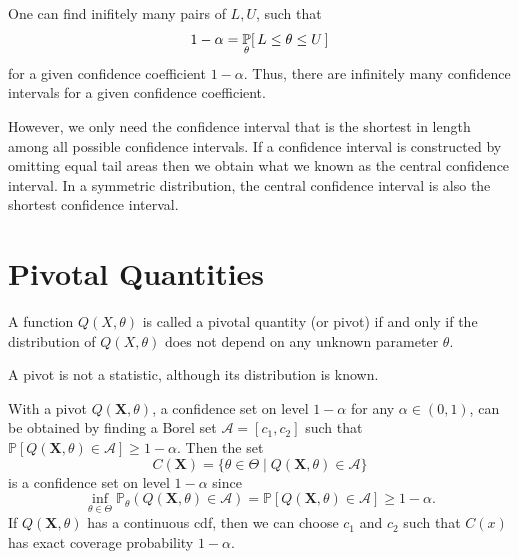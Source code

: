 One can find inifitely many pairs of $L, U$, such that 
\[
    1 - \alpha = \uprob[\theta]{ L \leq \theta \leq U }
\]
for a given confidence coefficient $1 - \alpha$. Thus, 
there are infinitely many confidence intervals for a given confidence coefficient.

However, we only need the confidence interval that is the shortest in length among all possible confidence intervals. 
If a confidence interval is constructed by omitting equal tail areas then we 
obtain what we known as the central confidence interval. 
In a symmetric distribution, the central confidence interval is also the shortest confidence interval.

\section{Pivotal Quantities}

\begin{definition}
    A function $Q(X, \theta)$ is called a pivotal quantity (or pivot) 
    if and only if the distribution of $Q(X, \theta)$ does not depend on any unknown parameter $\theta$.
\end{definition}
\begin{remark}
    A pivot is not a statistic, although its distribution is known. 
\end{remark}

With a pivot $Q(\mathbf{X}, \theta)$, a confidence set on level $1 - \alpha$ for any $\alpha \in (0,1)$, can be obtained 
by finding a Borel set $\mathcal{A} = [c_1, c_2]$ such that $\mathbb{P}[Q(\mathbf{X}, \theta) \in \mathcal{A}] \geq 1 - \alpha$.
Then the set 
\begin{equation}
    C(\mathbf{X}) = \{ \theta \in \Theta \mid Q(\mathbf{X}, \theta) \in \mathcal{A} \}
\end{equation}
is a confidence set on level $1 - \alpha$ since
\begin{equation}
    \inf_{\theta \in \Theta} \mathbb{P}_\theta(Q(\mathbf{X}, \theta) \in \mathcal{A}) = \mathbb{P}[Q(\mathbf{X}, \theta) \in \mathcal{A}] \geq 1 - \alpha.
\end{equation}
If $Q(\mathbf{X}, \theta)$ has a continuous cdf, then we can choose $c_1$ and $c_2$ such that 
$C(x)$ has exact coverage probability $1 - \alpha$.

